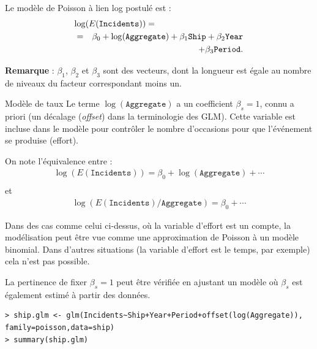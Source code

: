 \documentclass{BeamerTemplate}
\begin{document}
\begin{refsection}
\begin{frame}{}
Le modèle de Poisson à lien log postulé est :
\begin{eqnarray*}
\lefteqn{\log(E(\texttt{Incidents})) = \hspace*{4cm}}\\
& = & \beta_0 + \log(\texttt{Aggregate}) + \beta_1 \texttt{Ship} + \beta_2
\texttt{Year} \\
 & & + \beta_3 \texttt{Period}.
\end{eqnarray*}

\textbf{Remarque} : $\beta_1$, $\beta_2$ et $\beta_3$ sont des vecteurs, dont la longueur est
égale au nombre de niveaux du facteur correspondant moins un.
\end{frame}

\begin{frame}{Modèle de taux}
Le terme
$\log(\texttt{Aggregate})$ a un coefficient $\beta_{s}=1$, connu a priori (un
{\color{blue}décalage} (\textit{offset}) dans la terminologie des GLM). Cette variable est incluse dans le modèle
pour contrôler le nombre d'occasions pour que l'événement se produise (effort).

\bigskip
On note l'équivalence entre :
\begin{eqnarray*}
\log(E(\texttt{Incidents})) = \beta_0 + \log(\texttt{Aggregate}) + \cdots \\
\end{eqnarray*}
et
\begin{eqnarray*}
\log(E(\texttt{Incidents})/\texttt{Aggregate}) =  \beta_0 + \cdots 
\end{eqnarray*}
\end{frame}

\begin{frame}{}
Dans des cas comme celui ci-dessus, où la variable d'effort est un compte, la 
modélisation peut être vue comme une approximation de Poisson à un modèle binomial.  Dans d'autres
situations (la variable d'effort est le temps, par exemple) cela n'est pas possible.

\bigskip
\bigskip
 La pertinence de fixer $\beta_{s}=1$ peut être vérifiée en ajustant un modèle où
 $\beta_{s}$ est également estimé à partir des données. 
\end{frame}

\begin{frame}[fragile]{}

{\scriptsize
\begin{verbatim}
> ship.glm <- glm(Incidents~Ship+Year+Period+offset(log(Aggregate)),
family=poisson,data=ship)
> summary(ship.glm)


\end{verbatim}}
\end{frame}
\end{refsection}
\end{document}
